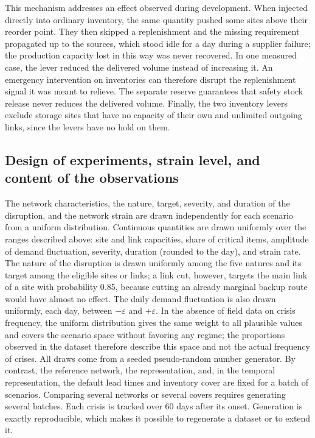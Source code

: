 This mechanism addresses an effect observed during development. When injected directly into ordinary inventory, the same quantity pushed some sites above their reorder point. They then skipped a replenishment and the missing requirement propagated up to the sources, which stood idle for a day during a supplier failure; the production capacity lost in this way was never recovered. In one measured case, the lever reduced the delivered volume instead of increasing it. An emergency intervention on inventories can therefore disrupt the replenishment signal it was meant to relieve. The separate reserve guarantees that safety stock release never reduces the delivered volume. Finally, the two inventory levers exclude storage sites that have no capacity of their own and unlimited outgoing links, since the levers have no hold on them.

\subsection{Design of experiments, strain level, and content of the observations}
\label{sec:S3.5}

The network characteristics, the nature, target, severity, and duration of the disruption, and the network strain are drawn independently for each scenario from a uniform distribution. Continuous quantities are drawn uniformly over the ranges described above: site and link capacities, share of critical items, amplitude of demand fluctuation, severity, duration (rounded to the day), and strain rate. The nature of the disruption is drawn uniformly among the five natures and its target among the eligible sites or links; a link cut, however, targets the main link of a site with probability 0.85, because cutting an already marginal backup route would have almost no effect. The daily demand fluctuation is also drawn uniformly, each day, between $-\varepsilon$ and $+\varepsilon$. In the absence of field data on crisis frequency, the uniform distribution gives the same weight to all plausible values and covers the scenario space without favoring any regime; the proportions observed in the dataset therefore describe this space and not the actual frequency of crises. All draws come from a seeded pseudo-random number generator. By contrast, the reference network, the representation, and, in the temporal representation, the default lead times and inventory cover are fixed for a batch of scenarios. Comparing several networks or several covers requires generating several batches. Each crisis is tracked over 60 days after its onset. Generation is exactly reproducible, which makes it possible to regenerate a dataset or to extend it.

